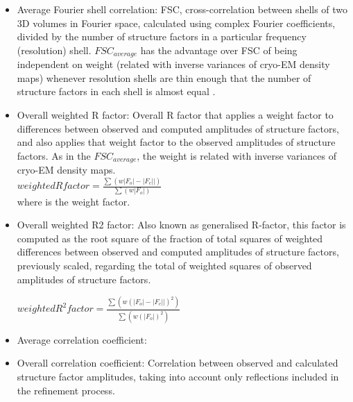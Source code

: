 \begin{itemize}
\begin{itemize}
\begin{itemize}
     \item Average Fourier shell correlation: FSC, cross-correlation between shells of two 3D volumes in Fourier space, calculated using complex Fourier coefficients, divided by the number of structure factors in a particular frequency (resolution) shell. \begin{math}FSC_{average}\end{math} has the advantage over FSC of being independent on weight (related with inverse variances of cryo-EM density maps) whenever resolution shells are thin enough that the number of structure factors in each shell is almost equal \citep{brown2015}.
     
     \item Overall weighted R factor: Overall R factor that applies a weight factor to differences between observed and computed amplitudes of structure factors, and also applies that weight factor to the observed amplitudes of structure factors. As in the \begin{math}FSC_{average}\end{math}, the weight is related with inverse variances of cryo-EM density maps.\\
     
     \begin{math}
           weighted R factor = \frac{\sum(w |F_o|-|F_c||)}{\sum(w |F_o|)}
     \end{math}\\
     
     where  is the weight factor.
     
     \item Overall weighted R2 factor: Also known as generalised R-factor, this factor is computed as the root square of the fraction of total squares of weighted differences between observed and computed amplitudes of structure factors, previously scaled, regarding the total of weighted squares of observed amplitudes of structure factors.
     
     \begin{math}
           weighted R^2 factor = \frac{\sum(w (|F_o|-|F_c||)^2)}{\sum(w (|F_o|)^2)}
     \end{math}\\
     
     \item Average correlation coefficient:
     
     \item Overall correlation coefficient: Correlation between observed and calculated structure factor amplitudes, taking into account only reflections included in the refinement process.
     

\end{itemize}
\end{itemize}
\end{itemize}
